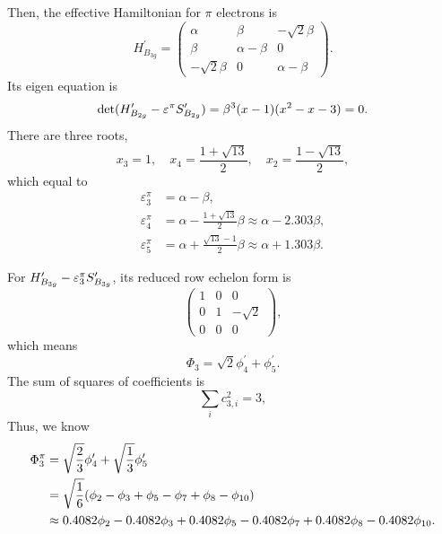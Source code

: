 		Then, the effective Hamiltonian for $\pi$ electrons is
		\begin{equation*}
			H^\prime_{B_{3g}} = \begin{pmatrix}
				\alpha	&	\beta	&	-\sqrt{2}\beta	\\
				\beta	&	\alpha-\beta	&	0		\\
				-\sqrt{2}\beta	&	0	&\alpha-\beta
				\end{pmatrix}.				
		\end{equation*}
		Its eigen equation is		
		\begin{equation*}
			\det(H^\prime_{B_{2g}}-\varepsilon^\pi S^\prime_{B_{2g}}) = \beta^3 (x-1)( x^2 - x - 3 ) = 0.
		\end{equation*}
		There are three roots,
		\begin{equation*}
			x_3 = 1, \quad x_4 = \frac{1+\sqrt{13}}{2}, \quad x_2 = \frac{1-\sqrt{13}}{2},
		\end{equation*}
		which equal to
		\begin{align}
			\varepsilon^\pi_3 &= \alpha - \beta, \\
			\varepsilon^\pi_4 &= \alpha - \frac{1+\sqrt{13}}{2}\beta \approx \alpha - 2.303 \beta, \\
			\varepsilon^\pi_5 &= \alpha + \frac{\sqrt{13}-1}{2}\beta \approx \alpha + 1.303 \beta.
		\end{align}
		
		For $H^\prime_{B_{3g}}-\varepsilon^\pi_3 S^\prime_{B_{3g}}$, its reduced row echelon form is
		\begin{equation*}
			\begin{pmatrix}
				1	& 0	&	0	\\	0	&	1	&	-\sqrt{2}	\\	0	&	0	&	0
			\end{pmatrix},
		\end{equation*}
		which means
		\begin{equation*}
			\Phi_3 = \sqrt{2}\phi^\prime_4 + \phi^\prime_5.
		\end{equation*}
		The sum of squares of coefficients is
		\begin{equation*}
			\sum_{i} c^2_{3,i} = 3,
		\end{equation*}
		Thus, we know
		\begin{align}
			\Phi^\pi_3 &= \sqrt{\frac{2}{3}} \phi^\prime_4 + \sqrt{\frac{1}{3}} \phi^\prime_5	\notag \\
			&= \sqrt{\frac{1}{6}} (\phi_2 - \phi_3 +\phi_5 - \phi_7 + \phi_8 -\phi_{10})  \notag \\
			&\approx 0.4082 \phi_2 - 0.4082 \phi_3 + 0.4082 \phi_5 -  0.4082\phi_7 + 0.4082 \phi_8 - 0.4082 \phi_{10}.
		\end{align}
		
